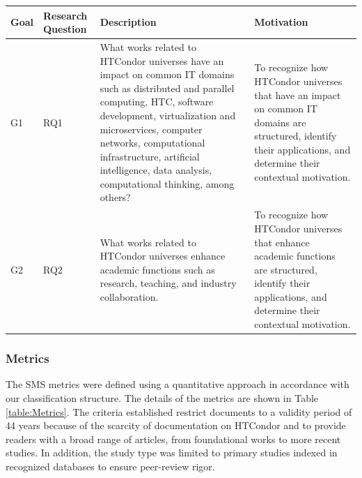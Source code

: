 \begin{table}
	{\begin{tabular}{p{0.5cm}p{1.4cm}p{6.0cm}p{4.5cm}} \toprule
			\textbf{Goal} & \textbf{Research Question} & \textbf{Description}                                                                                                                                                                                                                                                                                                 & \textbf{Motivation}                                                                                                                                                  \\
			\midrule
			G1            & RQ1                        & What works related to HTCondor universes have an impact on common IT domains such as distributed and parallel computing, HTC, software development, virtualization and microservices, computer networks, computational infrastructure, artificial intelligence, data analysis, computational thinking, among others? & To recognize how HTCondor universes that have an impact on common IT domains are structured, identify their applications, and determine their contextual motivation. \\
			G2            & RQ2                        & What works related to HTCondor universes enhance academic functions such as research, teaching, and industry collaboration.                                                                                                                                                                                          & To recognize how HTCondor universes that enhance academic functions are structured, identify their applications, and determine their contextual motivation.          \\
			\bottomrule
		\end{tabular}}
	\label{table:RQs}
\end{table}

\subsubsection{Metrics}
The SMS metrics were defined using a quantitative approach in accordance with our classification structure. The details of the metrics are shown in Table \ref{table:Metrics}. The criteria established restrict documents to a validity period of 44 years because of the scarcity of documentation on HTCondor and to provide readers with a broad range of articles, from foundational works to more recent studies. In addition, the study type was limited to primary studies indexed in recognized databases to ensure peer-review rigor.

